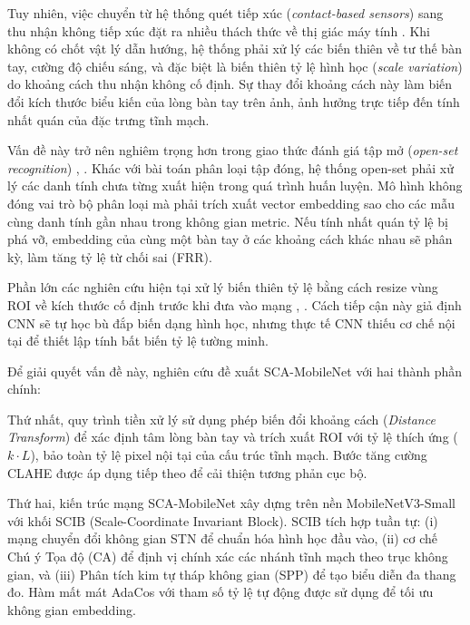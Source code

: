\documentclass[12pt,a4paper]{article}
\begin{document}
Tuy nhiên, việc chuyển từ hệ thống quét tiếp xúc (\textit{contact-based sensors}) sang thu nhận không tiếp xúc đặt ra nhiều thách thức về thị giác máy tính \cite{b1}. Khi không có chốt vật lý dẫn hướng, hệ thống phải xử lý các biến thiên về tư thế bàn tay, cường độ chiếu sáng, và đặc biệt là biến thiên tỷ lệ hình học (\textit{scale variation}) do khoảng cách thu nhận không cố định. Sự thay đổi khoảng cách này làm biến đổi kích thước biểu kiến của lòng bàn tay trên ảnh, ảnh hưởng trực tiếp đến tính nhất quán của đặc trưng tĩnh mạch.

Vấn đề này trở nên nghiêm trọng hơn trong giao thức đánh giá tập mở (\textit{open-set recognition}) \cite{b12}, \cite{b13}. Khác với bài toán phân loại tập đóng, hệ thống open-set phải xử lý các danh tính chưa từng xuất hiện trong quá trình huấn luyện. Mô hình không đóng vai trò bộ phân loại mà phải trích xuất vector embedding sao cho các mẫu cùng danh tính gần nhau trong không gian metric. Nếu tính nhất quán tỷ lệ bị phá vỡ, embedding của cùng một bàn tay ở các khoảng cách khác nhau sẽ phân kỳ, làm tăng tỷ lệ từ chối sai (FRR).

Phần lớn các nghiên cứu hiện tại xử lý biến thiên tỷ lệ bằng cách resize vùng ROI về kích thước cố định trước khi đưa vào mạng \cite{b1}, \cite{b4}. Cách tiếp cận này giả định CNN sẽ tự học bù đắp biến dạng hình học, nhưng thực tế CNN thiếu cơ chế nội tại để thiết lập tính bất biến tỷ lệ tường minh.

Để giải quyết vấn đề này, nghiên cứu đề xuất SCA-MobileNet với hai thành phần chính:

Thứ nhất, quy trình tiền xử lý sử dụng phép biến đổi khoảng cách (\textit{Distance Transform}) để xác định tâm lòng bàn tay và trích xuất ROI với tỷ lệ thích ứng ($k \cdot L$), bảo toàn tỷ lệ pixel nội tại của cấu trúc tĩnh mạch. Bước tăng cường CLAHE được áp dụng tiếp theo để cải thiện tương phản cục bộ.

Thứ hai, kiến trúc mạng SCA-MobileNet xây dựng trên nền MobileNetV3-Small \cite{b10} với khối SCIB (Scale-Coordinate Invariant Block). SCIB tích hợp tuần tự: (i) mạng chuyển đổi không gian STN \cite{b9} để chuẩn hóa hình học đầu vào, (ii) cơ chế Chú ý Tọa độ (CA) \cite{b7} để định vị chính xác các nhánh tĩnh mạch theo trục không gian, và (iii) Phân tích kim tự tháp không gian (SPP) \cite{b8} để tạo biểu diễn đa thang đo. Hàm mất mát AdaCos \cite{b11} với tham số tỷ lệ tự động được sử dụng để tối ưu không gian embedding.
\end{document}
